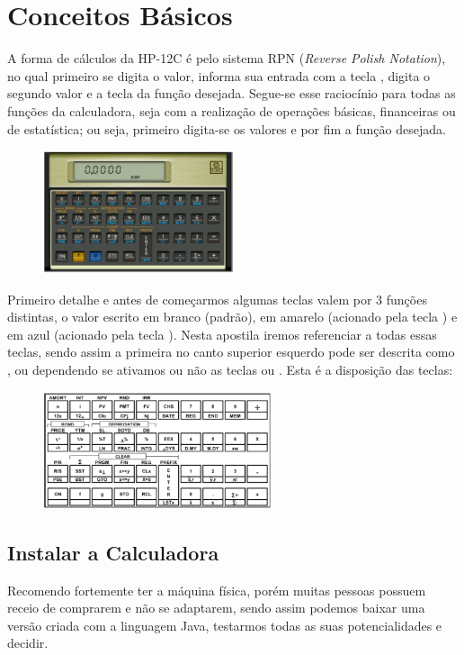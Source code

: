 \section*{Conceitos Básicos}	
A forma de cálculos da HP-12C é pelo sistema RPN (\textit{Reverse Polish Notation}), no qual primeiro se digita o valor, informa sua entrada com a tecla , digita o segundo valor e a tecla da função desejada. Segue-se esse raciocínio para todas as funções da calculadora, seja com a realização de operações básicas, financeiras ou de estatística; ou seja, primeiro digita-se os valores e por fim a função desejada. 
\begin{figure}[H]
	\centering
	\includegraphics[width=0.5\textwidth]{images/hp12c}
\end{figure}
\vspace{-1em}
Primeiro detalhe e antes de começarmos algumas teclas valem por 3 funções distintas, o valor escrito em branco (padrão), em amarelo (acionado pela tecla ) e em azul (acionado pela tecla ). Nesta apostila iremos referenciar a todas essas teclas, sendo assim a primeira no canto superior esquerdo pode ser descrita como ,  ou  dependendo se ativamos ou não as teclas  ou . Esta é a disposição das teclas:
\begin{figure}[H]
	\centering
	\includegraphics[width=0.6\textwidth]{images/teclado}
\end{figure}

\subsection*{Instalar a Calculadora}
Recomendo fortemente ter a máquina física, porém muitas pessoas possuem receio de comprarem e não se adaptarem, sendo assim podemos baixar uma versão \cite{hp12c} criada com a linguagem Java, testarmos todas as suas potencialidades e decidir.

